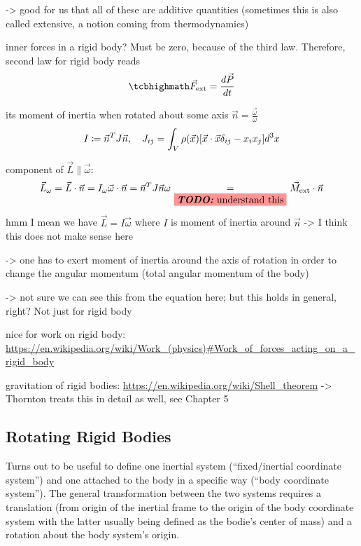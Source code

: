 \documentclass[../class_mech_main.tex]{subfiles}
\begin{document}

-> good for us that all of these are additive quantities (sometimes this is also called extensive, a notion coming from thermodynamics)


inner forces in a rigid body? Must be zero, because of the third law. Therefore, second law for rigid body reads
\begin{equation}
	\eqbox{
		\vec{F}_\mathrm{ext} = \dv{\vec{P}}{t}
	}
\end{equation}


its moment of inertia when rotated about some axis $\vec{n} = \frac{\vec{\omega}}{\omega}$
\begin{equation}
	I \coloneqq \vec{n}^T J \vec{n}, \quad J_{ij} = \int_V \rho(\vec{x}) \qty[\vec{x} \cdot \vec{x} \delta_{ij} - x_i x_j] d^3x
\end{equation}


component of $\vec{L} \parallel \vec{\omega}$:
\begin{equation}
	\vec{L}_\omega = \vec{L} \cdot \vec{n} = I_\omega \vec{\omega} \cdot \vec{n} = \vec{n}^T J \vec{n} \omega \underset{\todo{understand this}}{=} \vec{M}_\mathrm{ext} \cdot \vec{n}
\end{equation}
hmm I mean we have $\vec{L} = I \vec{\omega}$ where $I$ is moment of inertia around $\vec{n}$
-> I think this does not make sense here

-> one has to exert moment of inertia around the axis of rotation in order to change the angular momentum (total angular momentum of the body)

-> not sure we can see this from the equation here; but this holds in general, right? Not just for rigid body




nice for work on rigid body: \url{https://en.wikipedia.org/wiki/Work_(physics)#Work_of_forces_acting_on_a_rigid_body}



gravitation of rigid bodies: \url{https://en.wikipedia.org/wiki/Shell_theorem} -> Thornton treats this in detail as well, see Chapter 5



		\subsection{Rotating Rigid Bodies}
Turns out to be useful to define one inertial system (\enquote{fixed/inertial coordinate system}) and one attached to the body in a specific way (\enquote{body coordinate system}). The general transformation between the two systems requires a translation (from origin of the inertial frame to the origin of the body coordinate system with the latter usually being defined as the bodie's center of mass) and a rotation about the body system's origin.
\end{document}
